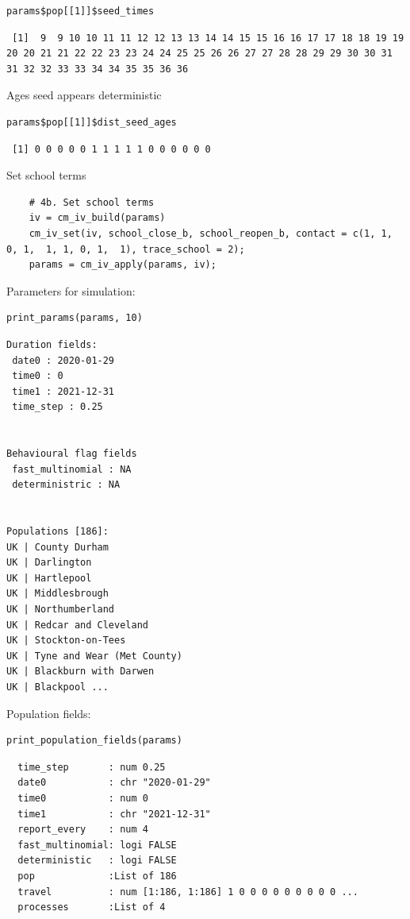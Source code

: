 \documentclass[11pt]{article}
\begin{document}
\begin{verbatim}
params$pop[[1]]$seed_times
\end{verbatim}

\begin{verbatim}
 [1]  9  9 10 10 11 11 12 12 13 13 14 14 15 15 16 16 17 17 18 18 19 19 20 20 21 21 22 22 23 23 24 24 25 25 26 26 27 27 28 28 29 29 30 30 31 31 32 32 33 33 34 34 35 35 36 36
\end{verbatim}

Ages seed appears deterministic
\begin{verbatim}
params$pop[[1]]$dist_seed_ages
\end{verbatim}

\begin{verbatim}
 [1] 0 0 0 0 0 1 1 1 1 1 0 0 0 0 0 0
\end{verbatim}

Set school terms
\begin{verbatim}
    # 4b. Set school terms
    iv = cm_iv_build(params)
    cm_iv_set(iv, school_close_b, school_reopen_b, contact = c(1, 1, 0, 1,  1, 1, 0, 1,  1), trace_school = 2);
    params = cm_iv_apply(params, iv);
\end{verbatim}


Parameters for simulation:
\begin{verbatim}
print_params(params, 10)
\end{verbatim}

\begin{verbatim}
Duration fields:
 date0 : 2020-01-29
 time0 : 0
 time1 : 2021-12-31
 time_step : 0.25


Behavioural flag fields
 fast_multinomial : NA
 deterministric : NA


Populations [186]:
UK | County Durham
UK | Darlington
UK | Hartlepool
UK | Middlesbrough
UK | Northumberland
UK | Redcar and Cleveland
UK | Stockton-on-Tees
UK | Tyne and Wear (Met County)
UK | Blackburn with Darwen
UK | Blackpool ...
\end{verbatim}

Population fields:
\begin{verbatim}
print_population_fields(params)
\end{verbatim}

\begin{verbatim}
  time_step       : num 0.25
  date0           : chr "2020-01-29"
  time0           : num 0
  time1           : chr "2021-12-31"
  report_every    : num 4
  fast_multinomial: logi FALSE
  deterministic   : logi FALSE
  pop             :List of 186
  travel          : num [1:186, 1:186] 1 0 0 0 0 0 0 0 0 0 ...
  processes       :List of 4
\end{verbatim}
\end{document}
